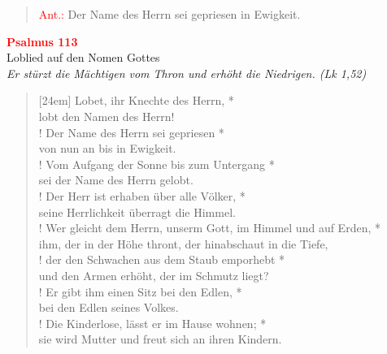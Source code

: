 \vspace*{2cm}

\begin{verse}
 \textcolor{red}{Ant.:} Der Name des Herrn sei gepriesen in Ewigkeit.
\end{verse}

\vspace*{0.2cm}

\begin{center}
 \textcolor{red}{\large \bf Psalmus 113}\\
Loblied auf den Nomen Gottes\\
\textit{\small Er stürzt die Mächtigen vom Thron und erhöht die Niedrigen. (Lk 1,52)}
\end{center}
\begin{verse}[24em]
Lobet, ihr Knechte des Herrn, *\\
lobt den Namen des Herrn!\\!
\vin  Der Name des Herrn sei gepriesen *\\
\vin  von nun an bis in Ewigkeit.\\!
Vom Aufgang der Sonne bis zum Untergang *\nopagebreak\\
sei der Name des Herrn gelobt.\\!
\vin  Der Herr ist erhaben über alle Völker, *\\
\vin  seine Herrlichkeit überragt die Himmel.\\!
Wer gleicht dem Herrn, \verselinebreak unserm Gott, im Himmel und auf Erden, *\\
ihm, der in der Höhe thront, der hinabschaut in die Tiefe,\\!
\vin  der den Schwachen aus dem Staub emporhebt *\\
\vin  und den Armen erhöht, der im Schmutz liegt?\\!
Er gibt ihm einen Sitz bei den Edlen, *\\
bei den Edlen seines Volkes.\\!
\vin  Die Kinderlose, lässt er im Hause wohnen; *\\
\vin sie wird Mutter und freut sich an ihren Kindern.
\end{verse}
\vspace{1cm}